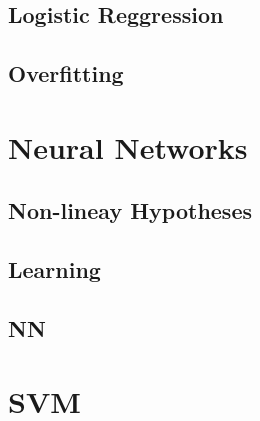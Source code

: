 \documentclass[en,11pt,english,black,simple,device=ppt]{elegantbook}
\begin{document}
\section{Logistic Reggression}



\section{Overfitting}



\chapter{Neural Networks}

\section{Non-lineay Hypotheses}



\section{Learning}



\section{NN}





\chapter{SVM}



\end{document}
